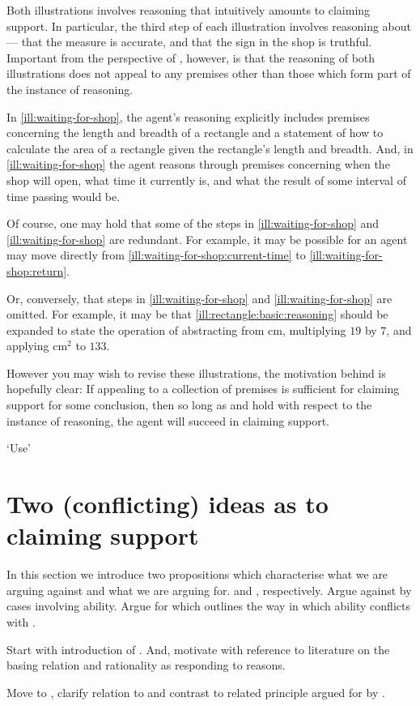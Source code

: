 \begin{note}
  Both illustrations involves reasoning that intuitively amounts to claiming support.
  In particular, the third step of each illustration involves reasoning about  --- that the measure is accurate, and that the sign in the shop is truthful.
  Important from the perspective of \USE{}, however, is that the reasoning of both illustrations does not appeal to any premises other than those which form part of the instance of reasoning.

  In \autoref{ill:waiting-for-shop}, the agent's reasoning explicitly includes premises concerning the length and breadth of a rectangle and a statement of how to calculate the area of a rectangle given the rectangle's length and breadth.
  And, in \autoref{ill:waiting-for-shop} the agent reasons through premises concerning when the shop will open, what time it currently is, and what the result of some interval of time passing would be.

  Of course, one may hold that some of the steps in \autoref{ill:waiting-for-shop} and \autoref{ill:waiting-for-shop} are redundant.
  For example, it may be possible for an agent may move directly from \ref{ill:waiting-for-shop:current-time} to \ref{ill:waiting-for-shop:return}.

  Or, conversely, that steps in \autoref{ill:waiting-for-shop} and \autoref{ill:waiting-for-shop} are omitted.
  For example, it may be that \ref{ill:rectangle:basic:reasoning} should be expanded to state the operation of abstracting from \(\text{cm}\), multiplying \(19\) by \(7\), and applying \(\text{cm}^{2}\) to \(133\).

  However you may wish to revise these illustrations, the motivation behind \USE{} is hopefully clear:
  If appealing to a collection of premises is sufficient for claiming support for some conclusion, then so long as \ideaCSA{} and \ideaCSB{} hold with respect to the instance of reasoning, the agent will succeed in claiming support.
\end{note}

\begin{note}[`Use']
  `Use'
\end{note}

\section{Two (conflicting) ideas as to claiming support}
\label{sec:inter-with-claim}

\begin{note}
  In this section we introduce two propositions which characterise what we are arguing against and what we are arguing for.
  \ESU{-} and \EAS{-}, respectively.
  Argue against \ESU{} by cases involving ability.
  Argue for \EAS{} which outlines the way in which ability conflicts with \ESU{}.

  Start with introduction of \ESU{}.
  And, motivate with reference to literature on the basing relation and rationality as responding to reasons.

  Move to \EAS{}, clarify relation to \ESU{} and contrast to related principle argued for by \citeauthor{Moretti:2019wx}.
\end{note}

